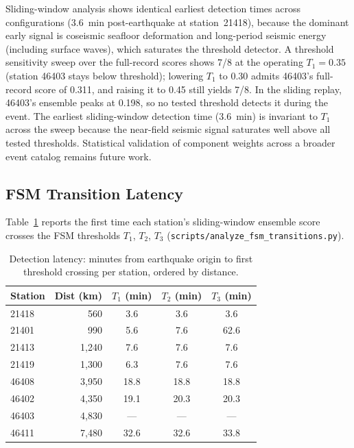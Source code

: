 \documentclass{article}
\begin{document}
Sliding-window analysis shows identical earliest detection
times across configurations (3.6~min post-earthquake at station~21418),
because the dominant early signal is coseismic seafloor deformation
and long-period seismic energy (including surface waves), which
saturates the threshold detector.
A threshold sensitivity sweep over the full-record scores shows 7/8
at the operating $T_1 = 0.35$ (station 46403 stays below threshold);
lowering $T_1$ to 0.30 admits 46403's full-record score of 0.311, and
raising it to 0.45 still yields 7/8.  In the sliding replay, 46403's
ensemble peaks at 0.198, so no tested threshold detects it during the
event.
The earliest sliding-window detection time (3.6~min) is invariant to
$T_1$ across the sweep because the near-field seismic signal saturates
well above all tested thresholds.
Statistical validation of component weights across a broader event
catalog remains future work.

\FloatBarrier
\subsection{FSM Transition Latency}
\label{sec:eval-fsm}

Table~\ref{tab:fsm-transitions} reports the first time each station's
sliding-window ensemble score crosses the FSM thresholds $T_1$, $T_2$,
$T_3$ (\texttt{scripts/analyze\_fsm\_transitions.py}).

\begin{table}[!htb]
\centering
\caption{Detection latency: minutes from earthquake origin to first
  threshold crossing per station, ordered by distance.}
\label{tab:fsm-transitions}
\small
\begin{tabular}{lrccc}
\toprule
\textbf{Station} & \textbf{Dist (km)}
  & $T_1$ \textbf{(min)} & $T_2$ \textbf{(min)} & $T_3$ \textbf{(min)} \\
\midrule
21418 &   560 &  3.6 &  3.6 &  3.6 \\
21401 &   990 &  5.6 &  7.6 & 62.6 \\
21413 & 1{,}240 &  7.6 &  7.6 &  7.6 \\
21419 & 1{,}300 &  6.3 &  7.6 &  7.6 \\
46408 & 3{,}950 & 18.8 & 18.8 & 18.8 \\
46402 & 4{,}350 & 19.1 & 20.3 & 20.3 \\
46403 & 4{,}830 &  --- & --- & --- \\
46411 & 7{,}480 & 32.6 & 32.6 & 33.8 \\
\bottomrule
\end{tabular}
\end{table}
\end{document}
